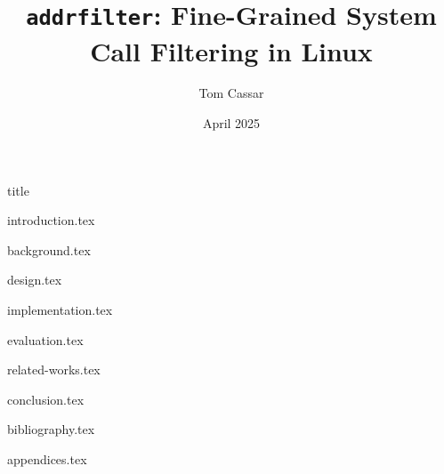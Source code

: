 \documentclass[fontsize=14pt]{article}
\title{\texttt{addrfilter}: Fine-Grained System Call Filtering in Linux}
\author{Tom Cassar}
\date{April 2025}
\begin{document}
\maketitle

\thispagestyle{empty}


\clearpage
\setcounter{page}{1}
{title}

\clearpage


{introduction.tex}

\clearpage

{background.tex}

\clearpage

{design.tex}

\clearpage

{implementation.tex}

\clearpage

{evaluation.tex}

\clearpage

{related-works.tex}

\clearpage

{conclusion.tex}

\clearpage

{bibliography.tex}

\clearpage

{appendices.tex}
\end{document}
